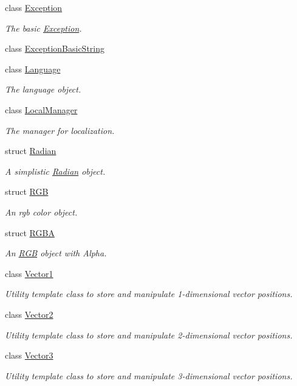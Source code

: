 \begin{DoxyCompactItemize}
class \hyperlink{class_triton_1_1_util_1_1_exception}{Exception}
\begin{DoxyCompactList}\small\item\em The basic \hyperlink{class_triton_1_1_util_1_1_exception}{Exception}. \end{DoxyCompactList}\item 
class \hyperlink{class_triton_1_1_util_1_1_exception_basic_string}{Exception\+Basic\+String}
\item 
class \hyperlink{class_triton_1_1_util_1_1_language}{Language}
\begin{DoxyCompactList}\small\item\em The language object. \end{DoxyCompactList}\item 
class \hyperlink{class_triton_1_1_util_1_1_local_manager}{Local\+Manager}
\begin{DoxyCompactList}\small\item\em The manager for localization. \end{DoxyCompactList}\item 
struct \hyperlink{struct_triton_1_1_util_1_1_radian}{Radian}
\begin{DoxyCompactList}\small\item\em A simplistic \hyperlink{struct_triton_1_1_util_1_1_radian}{Radian} object. \end{DoxyCompactList}\item 
struct \hyperlink{struct_triton_1_1_util_1_1_r_g_b}{R\+G\+B}
\begin{DoxyCompactList}\small\item\em An rgb color object. \end{DoxyCompactList}\item 
struct \hyperlink{struct_triton_1_1_util_1_1_r_g_b_a}{R\+G\+B\+A}
\begin{DoxyCompactList}\small\item\em An \hyperlink{struct_triton_1_1_util_1_1_r_g_b}{R\+G\+B} object with Alpha. \end{DoxyCompactList}\item 
class \hyperlink{class_triton_1_1_util_1_1_vector1}{Vector1}
\begin{DoxyCompactList}\small\item\em Utility template class to store and manipulate 1-\/dimensional vector positions. \end{DoxyCompactList}\item 
class \hyperlink{class_triton_1_1_util_1_1_vector2}{Vector2}
\begin{DoxyCompactList}\small\item\em Utility template class to store and manipulate 2-\/dimensional vector positions. \end{DoxyCompactList}\item 
class \hyperlink{class_triton_1_1_util_1_1_vector3}{Vector3}
\begin{DoxyCompactList}\small\item\em Utility template class to store and manipulate 3-\/dimensional vector positions. \end{DoxyCompactList}\end{DoxyCompactItemize}
